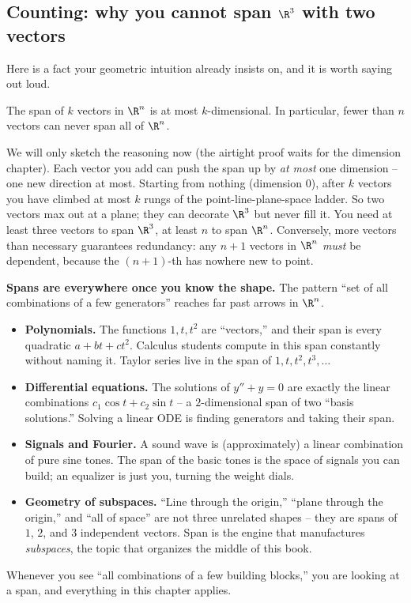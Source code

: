 \subsection{Counting: why you cannot span $\R^3$ with two vectors}

Here is a fact your geometric intuition already insists on, and it is worth saying out loud.

\begin{proposition}\label{ch03:prop-too-few}
The span of $k$ vectors in $\R^n$ is at most $k$-dimensional. In particular, fewer than $n$ vectors can never span all of $\R^n$.
\end{proposition}

We will only sketch the reasoning now (the airtight proof waits for the dimension chapter). Each vector you add can push the span up by \emph{at most} one dimension -- one new direction at most. Starting from nothing (dimension $0$), after $k$ vectors you have climbed at most $k$ rungs of the point-line-plane-space ladder. So two vectors max out at a plane; they can decorate $\R^3$ but never fill it. You need at least three vectors to span $\R^3$, at least $n$ to span $\R^n$. Conversely, more vectors than necessary guarantees redundancy: any $n+1$ vectors in $\R^n$ \emph{must} be dependent, because the $(n{+}1)$-th has nowhere new to point.

\begin{connectionbox}
\textbf{Spans are everywhere once you know the shape.} The pattern ``set of all combinations of a few generators'' reaches far past arrows in $\R^n$.
\begin{itemize}
  \item \textbf{Polynomials.} The functions $1, t, t^2$ are ``vectors,'' and their span is every quadratic $a + bt + ct^2$. Calculus students compute in this span constantly without naming it. Taylor series live in the span of $1, t, t^2, t^3, \dots$
  \item \textbf{Differential equations.} The solutions of $y'' + y = 0$ are exactly the linear combinations $c_1\cos t + c_2\sin t$ -- a $2$-dimensional span of two ``basis solutions.'' Solving a linear ODE is finding generators and taking their span.
  \item \textbf{Signals and Fourier.} A sound wave is (approximately) a linear combination of pure sine tones. The span of the basic tones is the space of signals you can build; an equalizer is just you, turning the weight dials.
  \item \textbf{Geometry of subspaces.} ``Line through the origin,'' ``plane through the origin,'' and ``all of space'' are not three unrelated shapes -- they are spans of $1$, $2$, and $3$ independent vectors. Span is the engine that manufactures \emph{subspaces}, the topic that organizes the middle of this book.
\end{itemize}
Whenever you see ``all combinations of a few building blocks,'' you are looking at a span, and everything in this chapter applies.
\end{connectionbox}

